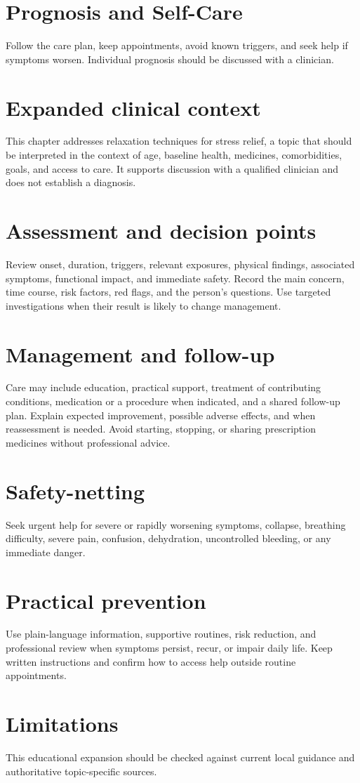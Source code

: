 \section*{Prognosis and Self-Care}
Follow the care plan, keep appointments, avoid known triggers, and seek help if symptoms worsen. Individual prognosis should be discussed with a clinician.

\section*{Expanded clinical context}
This chapter addresses relaxation techniques for stress relief, a topic that should be interpreted in the context of age, baseline health, medicines, comorbidities, goals, and access to care. It supports discussion with a qualified clinician and does not establish a diagnosis.

\section*{Assessment and decision points}
Review onset, duration, triggers, relevant exposures, physical findings, associated symptoms, functional impact, and immediate safety. Record the main concern, time course, risk factors, red flags, and the person’s questions. Use targeted investigations when their result is likely to change management.

\section*{Management and follow-up}
Care may include education, practical support, treatment of contributing conditions, medication or a procedure when indicated, and a shared follow-up plan. Explain expected improvement, possible adverse effects, and when reassessment is needed. Avoid starting, stopping, or sharing prescription medicines without professional advice.

\section*{Safety-netting}
Seek urgent help for severe or rapidly worsening symptoms, collapse, breathing difficulty, severe pain, confusion, dehydration, uncontrolled bleeding, or any immediate danger.

\section*{Practical prevention}
Use plain-language information, supportive routines, risk reduction, and professional review when symptoms persist, recur, or impair daily life. Keep written instructions and confirm how to access help outside routine appointments.

\section*{Limitations}
This educational expansion should be checked against current local guidance and authoritative topic-specific sources.
\clearpage
